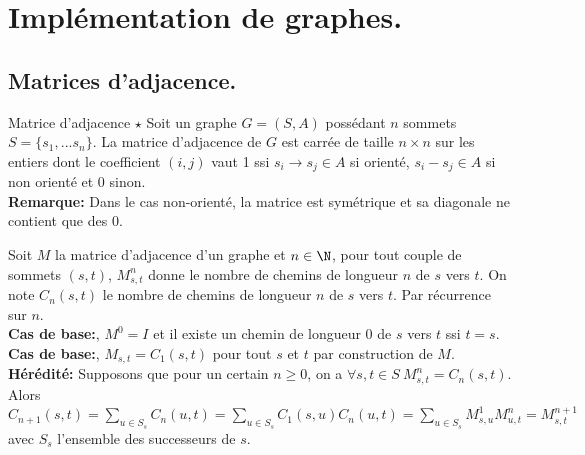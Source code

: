 \documentclass[french, 11pt]{article}
\begin{document}
\vspace*{-1.1cm}

\section{Implémentation de graphes.}

\vspace*{-0.2cm}

\subsection{Matrices d'adjacence.}
\begin{defi}{Matrice d'adjacence $\star$}{}
    Soit un graphe $G=(S,A)$ possédant $n$ sommets $S=\{s_1,...s_n\}$. La matrice d'adjacence de $G$ est carrée de taille $n\times n$ sur les entiers dont le coefficient $(i,j)$ vaut 1 ssi $s_i\to s_j\in A$ si orienté, $s_i-s_j\in A$ si non orienté et 0 sinon.\\
    \textbf{Remarque:} Dans le cas non-orienté, la matrice est symétrique et sa diagonale ne contient que des 0.  
\end{defi}

\vspace*{-0.8cm}

\begin{prop}{}{}
    Soit $M$ la matrice d'adjacence d'un graphe et $n\in\N$, pour tout couple de sommets $(s,t)$, $M_{s,t}^n$ donne le nombre de chemins de longueur $n$ de $s$ vers $t$.
    \tcblower
    On note $C_n(s,t)$ le nombre de chemins de longueur $n$ de $s$ vers $t$. Par récurrence sur $n$.\\
    \textbf{Cas de base:}, $M^0=I$ et il existe un chemin de longueur 0 de $s$ vers $t$ ssi $t=s$.\\
    \textbf{Cas de base:}, $M_{s,t}=C_1(s,t)$ pour tout $s$ et $t$ par construction de $M$.\\
    \textbf{Hérédité:} Supposons que pour un certain $n\geq0$, on a $\forall s,t\in S ~ M_{s,t}^n=C_n(s,t)$.\\
    Alors $C_{n+1}(s,t)=\sum_{u\in S_s}C_n(u,t)=\sum_{u\in S_s}C_1(s,u)C_n(u,t)=\sum_{u\in S_s}M^1_{s,u}M^n_{u,t}=M^{n+1}_{s,t}$ avec $S_s$ l'ensemble des successeurs de $s$. 
\end{prop}
\end{document}
